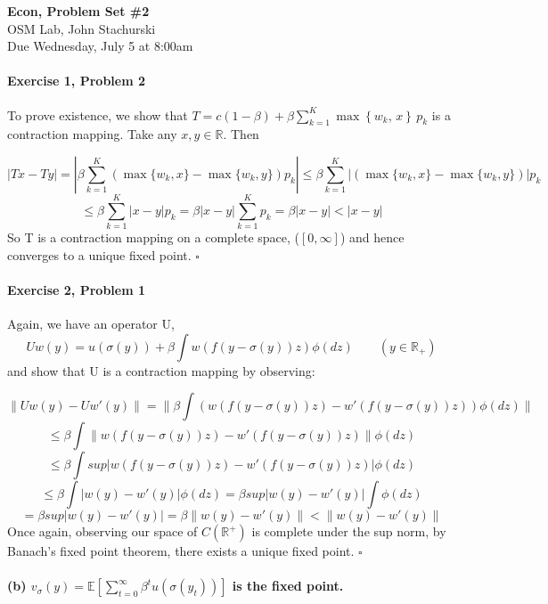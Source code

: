 \documentclass[letterpaper,12pt]{article}
\theoremstyle{definition}
\begin{document}
\begin{flushleft}
   \textbf{\large{Econ, Problem Set \#2}} \\[5pt]
   OSM Lab, John Stachurski \\[5pt]
   Due Wednesday, July 5 at 8:00am
\end{flushleft}

\vspace{5mm}
   
\paragraph{Exercise 1, Problem 2}
To prove existence, we show that $ T = c (1 - \beta) + \beta
    \sum_{k=1}^K \max \left\{
        w_k ,\, x
    \right\}
    \, p_k$ 
is a contraction mapping. Take any $x, y \in \mathbb R$. Then

$$ |Tx - Ty| 
= | \beta \sum_{k=1}^K (\max\{w_k , x\} - \max\{w_k , y\}) p_k |
\le \beta \sum_{k=1}^K |(\max\{w_k , x\} - \max\{w_k , y\})| p_k$$
$$ \le \beta \sum_{k=1}^K |x - y| p_k
= \beta |x - y| \sum_{k=1}^K  p_k
= \beta |x - y|
< |x - y|
$$
So T is a contraction mapping on a complete space, ($[0, \infty]$) and hence converges to a unique fixed point. $\square$

\paragraph{Exercise 2, Problem 1}
Again, we have an operator U, $$ Uw(y) = u(\sigma(y)) + \beta \int w(f(y - \sigma(y))z) \phi(dz) \qquad (y \in \mathbb R_+)$$
and show that U is a contraction mapping by observing:

$$ \|Uw(y) - Uw'(y)\| = \|\beta \int (w(f(y - \sigma(y))z) - w'(f(y - \sigma(y))z))  \phi(dz)\| $$
$$ \le \beta \int \|w(f(y - \sigma(y))z) - w'(f(y - \sigma(y))z)\|  \phi(dz) $$
$$ \le \beta \int sup|w(f(y - \sigma(y))z) - w'(f(y - \sigma(y))z)|  \phi(dz) $$
$$  \le \beta \int |w(y) - w'(y)|  \phi(dz) 
= \beta  sup|w(y) - w'(y)| \int  \phi(dz)$$
$$ = \beta  sup|w(y) - w'(y)|
= \beta  \|w(y) - w'(y)\|
< \|w(y) - w'(y)\|$$
Once again, observing our space of $C(\mathbb{R}^+)$ is complete under the sup norm, by Banach's fixed point theorem, there exists a unique fixed point. $\square$

\paragraph{(b) $v_{\sigma}(y) =
\mathbb E \left[ \sum_{t = 0}^{\infty} \beta^t u(\sigma(y_t)) \right]$ is the fixed point.}
\end{document}

